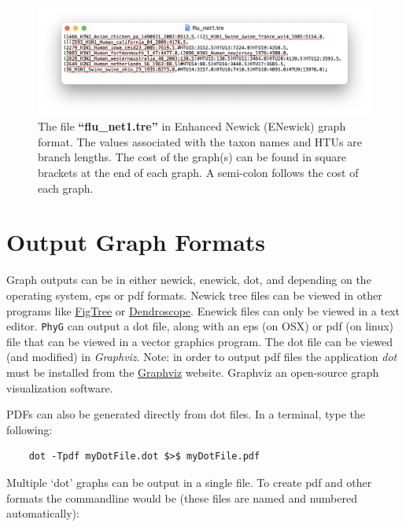\documentclass[11pt]{book}
\newcommand{\phyg}{\texttt{PhyG} }
\begin{document}
{{	\begin{figure}[H]
	\centering
	\includegraphics[width=\textwidth]{enewick.png}
	\caption{The file \textbf{``flu\_net1.tre''} in Enhanced Newick (ENewick) graph format. The 
	values associated with the taxon names and HTUs are branch lengths. The cost of the 
	graph(s) can be found in square brackets at the end of each graph. A semi-colon follows
	the cost of each graph.}
	\label{enewick}
	\end{figure}
	
\section{Output Graph Formats}
	Graph outputs can be in either newick, enewick, dot, and depending on the 
	operating system, eps or pdf formats. Newick tree files can be viewed in other 
	programs like \href{http://tree.bio.ed.ac.uk/software/figtree/}{FigTree} or 	
	\href{http:/https://uni-tuebingen.de/fakultaeten/mathematisch-naturwissenschaftliche-fakultaet/fachbereiche/informatik/lehrstuehle/algorithms-in-bioinformatics/software/}{Dendroscope}. 
	Enewick files can only be viewed in a text editor. \phyg can output a dot file, 
	along with an eps (on OSX) or pdf (on linux) file that can be viewed in a vector 
	graphics program. The dot file can be viewed (and modified) in \textit{Graphviz}. 
	Note: in order to output pdf files the application \textit{dot} must be installed from 
	the \href{https://graphviz.org/download/}{Graphviz} website. Graphviz an open-source
	graph visualization software. 	
	
	PDFs can also be generated directly from dot files. In a terminal, type the following: 

	\begin{verbatim}
	dot -Tpdf myDotFile.dot $>$ myDotFile.pdf
	\end{verbatim}
		
	Multiple `dot' graphs can be output in a single file. To create pdf and other formats the
	commandline would be (these files are named and numbered automatically):
	
}}
\end{document}
